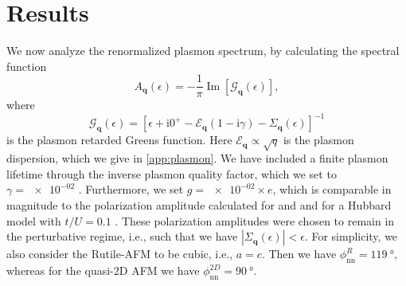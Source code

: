 \documentclass[aps,prb,reprint,twocolumns,superscriptaddress,nofootinbib]{revtex4-2}
\newcommand{\ii}{\mathrm{i}}
\renewcommand{\Im}{\operatorname{Im}}
\newcommand{\gammaplasmon}{\num{e-02}}
\newcommand{\gpolarizationrutile}{\num{e-02}}
\begin{document}
	\section{Results}
	\label{sec:results}
	We now analyze the renormalized plasmon spectrum, by calculating the spectral function \cite{stoofUltracoldQuantumFields2009}
	\begin{equation}
		A_{\bm q}(\epsilon) = -\frac{1}{\pi}\Im[\mathcal G_{\bm q}(\epsilon)],
	\end{equation}
	where 
	\begin{equation}
		\mathcal G_{\bm q}(\epsilon) = \left[\epsilon + \ii 0^+ - \mathcal{E}_{\bm q}(1-\ii\gamma) - \Sigma_{\bm q}(\epsilon) \right]^{-1}
	\end{equation}
	is the plasmon retarded Greens function. Here $\mathcal E_{\bm q}\propto\sqrt{q}$ is the plasmon dispersion, which we give in \cref{app:plasmon}. We have included a finite plasmon lifetime through the inverse plasmon quality factor, which we set to $\gamma=\gammaplasmon$ \cite{principiIntrinsicLifetimeDirac2013}. 
	Furthermore, we set $g=\gpolarizationrutile\times e$, which is comparable in magnitude to the polarization amplitude calculated for  \cite{seifertOpticalExcitationMagnons2019} and  \cite{mostovoyTemperatureDependentMagnetoelectricEffect2010} and for a Hubbard model with $t/U=0.1$ \cite{zhuSpinorbitCouplingElectronic2014}. These polarization amplitudes were chosen to remain in the perturbative regime, i.e., such that we have $|\Sigma_{\bm q}(\epsilon)|<\epsilon$. For simplicity, we also consider the Rutile-AFM to  be cubic, i.e., $a=c$. Then we have $\phi_{\mathrm{nn}}^{R}=\SI{119}{\degree}$, whereas for the quasi-2D AFM we have $\phi_{\mathrm{nn}}^{2D}=\SI{90}{\degree}$.
	
\end{document}

